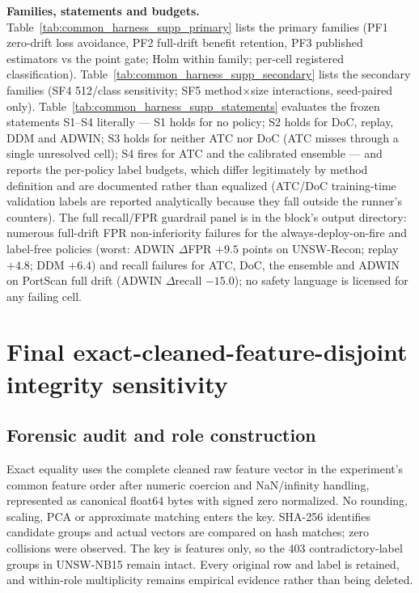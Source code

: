 \documentclass[a4paper,11pt]{article}
\makeatletter
\let\supp@subsection\subsection
\renewcommand{\subsection}{\FloatBarrier\supp@subsection}
\makeatother
\begin{document}
\textbf{Families, statements and budgets.} Table~\ref{tab:common_harness_supp_primary}
lists the primary families (PF1 zero-drift loss avoidance, PF2 full-drift benefit
retention, PF3 published estimators vs the point gate; Holm within family; per-cell
registered classification). Table~\ref{tab:common_harness_supp_secondary} lists the
secondary families (SF4 512/class sensitivity; SF5 method$\times$size interactions,
seed-paired only). Table~\ref{tab:common_harness_supp_statements} evaluates the frozen
statements S1--S4 literally --- S1 holds for no policy; S2 holds for DoC, replay, DDM and
ADWIN; S3 holds for neither ATC nor DoC (ATC misses through a single unresolved cell); S4
fires for ATC and the calibrated ensemble --- and reports the per-policy label budgets,
which differ legitimately by method definition and are documented rather than equalized
(ATC/DoC training-time validation labels are reported analytically because they fall
outside the runner's counters). The full recall/FPR guardrail panel is
 in the block's output directory: numerous full-drift FPR
non-inferiority failures for the always-deploy-on-fire and label-free policies (worst:
ADWIN $\Delta$FPR $+9.5$ points on UNSW-Recon; replay $+4.8$; DDM $+6.4$) and recall
failures for ATC, DoC, the ensemble and ADWIN on PortScan full drift (ADWIN
$\Delta$recall $-15.0$); no safety language is licensed for any failing cell.





\section{Final exact-cleaned-feature-disjoint integrity sensitivity}
\label{sec:supp_value_disjoint}

\subsection{Forensic audit and role construction}

Exact equality uses the complete cleaned raw feature vector in the experiment's common
feature order after numeric coercion and NaN/infinity handling, represented as canonical
float64 bytes with signed zero normalized. No rounding, scaling, PCA or approximate
matching enters the key. SHA-256 identifies candidate groups and actual vectors are
compared on hash matches; zero collisions were observed. The key is features only, so
the 403 contradictory-label groups in UNSW-NB15 remain intact. Every original row and
label is retained, and within-role multiplicity remains empirical evidence rather than
being deleted.
\end{document}
